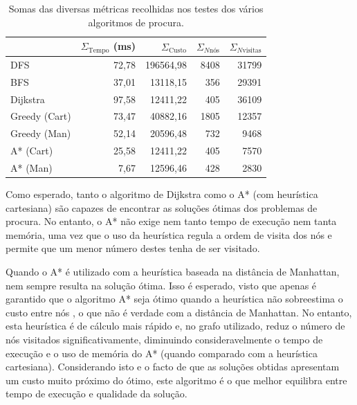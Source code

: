 \documentclass[12pt, a4paper]{article}
\begin{document}
\begin{table}[H]
    \small

    \begin{adjustwidth}{-1.5cm}{-1.5cm}
        \begin{center}
            \begin{tabular}{|l|r|r|r|r|}
                \hline
                                               &
                    $\Sigma_\text{Tempo}$ (ms) &
                    $\Sigma_\text{Custo}$      &
                    $\Sigma_{N\text{nós}}$     &
                    $\Sigma_{N\text{visitas}}$ \\

                \hline
                DFS & 72,78 & 196564,98 & 8408 & 31799 \\
                \hline
                BFS & 37,01 & 13118,15 & 356 & 29391 \\
                \hline
                Dijkstra & 97,58 & 12411,22 & 405 & 36109 \\
                \hline
                Greedy (Cart) & 73,47 & 40882,16 & 1805 & 12357 \\
                \hline
                Greedy (Man) & 52,14 & 20596,48 & 732 & 9468 \\
                \hline
                A* (Cart) & 25,58 & 12411,22 & 405 & 7570 \\
                \hline
                A* (Man) & 7,67 & 12596,46 & 428 & 2830 \\
                \hline
            \end{tabular}
        \end{center}
    \end{adjustwidth}

    \caption{Somas das diversas métricas recolhidas nos testes dos vários algoritmos de procura.}
\end{table}

Como esperado, tanto o algoritmo de Dijkstra como o A* (com heurística cartesiana) são capazes de
encontrar as soluções ótimas dos problemas de procura. No entanto, o A* não exige nem tanto tempo de
execução nem tanta memória, uma vez que o uso da heurística regula a ordem de visita dos nós e
permite que um menor número destes tenha de ser visitado.

Quando o A* é utilizado com a heurística baseada na distância de Manhattan, nem sempre resulta na
solução ótima. Isso é esperado, visto que apenas é garantido que o algoritmo A* seja ótimo quando
a heurística não sobreestima o custo entre nós \cite{aima}, o que não é verdade com a distância de
Manhattan. No entanto, esta heurística é de cálculo mais rápido e, no grafo utilizado, reduz o
número de nós visitados significativamente, diminuindo consideravelmente o tempo de execução e o uso
de memória do A* (quando comparado com a heurística cartesiana). Considerando isto e o facto de que
as soluções obtidas apresentam um custo muito próximo do ótimo, este algoritmo é o que melhor
equilibra entre tempo de execução e qualidade da solução.
\end{document}
